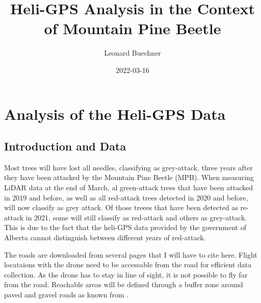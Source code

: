 \documentclass[
]{article}
\title{Heli-GPS Analysis in the Context of Mountain Pine Beetle}
\author{Leonard Buechner}
\date{2022-03-16}
\begin{document}
\maketitle

\hypertarget{analysis-of-the-heli-gps-data}{%
\section{Analysis of the Heli-GPS
Data}\label{analysis-of-the-heli-gps-data}}

\hypertarget{introduction-and-data}{%
\subsection{Introduction and Data}\label{introduction-and-data}}

Most trees will have lost all needles, classifying as grey-attack, three
years after they have been attacked by the Mountain Pine Beetle (MPB).
When measuring LiDAR data at the end of March, al green-attack trees
that have been attacked in 2019 and before, as well as all red-attack
trees detected in 2020 and before, will now classify as grey attack. Of
those treees that have been detected as re-attack in 2021, some will
still classify as red-attack and others as grey-attack. This is due to
the fact that the heli-GPS data provided by the government of Alberta
cannot distinguish between different years of red-attack.

The roads are downloaded from several pages that I will have to cite
here. Flight locataions with the drone need to be accessable from the
road for efficient data collection. As the drone has to stay in line of
sight, it is not possible to fly far from the road. Reachable areas will
be defined through a buffer zone around paved and gravel roads as known
from \citep{GravelRoad23}.

\renewcommand\refname{References}
  
\end{document}
